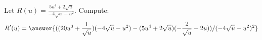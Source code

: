\documentclass{ximera}
\begin{document}
\begin{exercise}

Let $R(u) = \frac{ 5 u^4+2 \sqrt{u}}{-4 \sqrt{u}-u^2}$. Compute:
\[
R'(u)
=\answer{ ( (20u^3+\frac{1}{\sqrt{u}})(-4\sqrt{u}-u^2)-(5 u^4+2 \sqrt{u})(-\frac{2}{\sqrt{u}}-2u))/(-4\sqrt{u}-u^2)^2 }
\]
\end{exercise}
\end{document}

